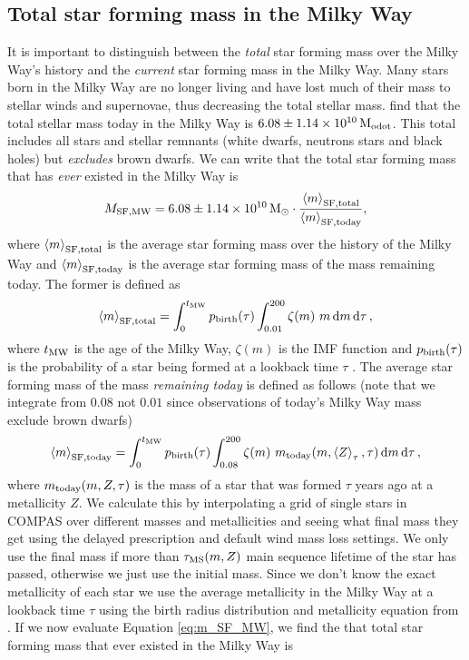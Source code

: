 \subsection{Total star forming mass in the Milky Way}
It is important to distinguish between the \textit{total} star forming mass over the Milky Way's history and the \textit{current} star forming mass in the Milky Way. Many stars born in the Milky Way are no longer living and have lost much of their mass to stellar winds and supernovae, thus decreasing the total stellar mass. \citet{Licquia+2015} find that the total stellar mass today in the Milky Way is $6.08 \pm 1.14 \times 10^{10} \unit{M_{\rm odot}}$. This total includes all stars and stellar remnants (white dwarfs, neutrons stars and black holes) but \textit{excludes} brown dwarfs. We can write that the total star forming mass that has \textit{ever} existed in the Milky Way is
\begin{equation}\label{eq:m_SF_MW}
    M_{\rm SF, MW} = 6.08 \pm 1.14 \times 10^{10} \unit{M_{\rm \odot}} \cdot \frac{\avg{m}_{\rm SF, total}}{\avg{m}_{\rm SF, today}},
\end{equation}
where $\left\langle m\right\rangle_{\rm SF, total}$ is the average star forming mass over the history of the Milky Way and $\left\langle m\right\rangle_{\rm SF, today}$ is the average star forming mass of the mass remaining today. The former is defined as
\begin{equation}
    \avg{m}_{\rm SF, total} = \int_{0}^{t_{\rm MW}} p_{\rm birth}(\tau) \int_{0.01}^{200} \zeta(m)\ m \dd{m} \dd{\tau},
\end{equation}
where $t_{\rm MW}$ is the age of the Milky Way, $\zeta(m)$ is the \citet{Kroupa+2001} IMF function and $p_{\rm birth}(\tau)$ is the probability of a star being formed at a lookback time $\tau$ \citep[][Eq.~4]{Frankel+2018}. The average star forming mass of the mass \textit{remaining today} is defined as follows (note that we integrate from $0.08$ not $0.01$ since observations of today's Milky Way mass exclude brown dwarfs)
\begin{equation}
    \avg{m}_{\rm SF, today} = \int_{0}^{t_{\rm MW}} p_{\rm birth}(\tau) \int_{0.08}^{200} \zeta(m)\ m_{\rm today}(m, \avg{Z}_\tau, \tau) \dd{m} \dd{\tau},
\end{equation}
where $m_{\rm today}(m, Z, \tau)$ is the mass of a star that was formed $\tau$ years ago at a metallicity $Z$. We calculate this by interpolating a grid of single stars in COMPAS over different masses and metallicities and seeing what final mass they get using the \citet{Fryer+2012} delayed prescription and default wind mass loss settings. We only use the final mass if more than $\tau_{\rm MS}(m, Z)$ main sequence lifetime of the star has passed, otherwise we just use the initial mass. Since we don't know the exact metallicity of each star we use the average metallicity in the Milky Way at a lookback time $\tau$ using the birth radius distribution and metallicity equation from \citet{Frankel+2018}. If we now evaluate Equation \ref{eq:m_SF_MW}, we find the that total star forming mass that ever existed in the Milky Way is
